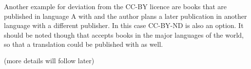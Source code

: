 Another example for deviation from the CC-BY licence are books that are published in language A with
\lsp and the author plans a later publication in another language with a different publisher. In
this case CC-BY-ND is also an option. It should be noted though that \lsp accepts books in the major
languages of the world, so that a translation could be published with \lsp as well.

(more details will follow later)


